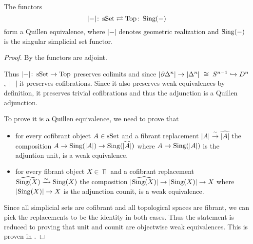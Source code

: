 \begin{prop}
    The functors
    \begin{equation*}
        \lvert-\rvert\colon\operatorname{sSet}\rightleftarrows\operatorname{Top}\colon\operatorname{Sing}(-)
    \end{equation*}
    form a Quillen equivalence, where $\lvert-\rvert$ denotes geometric realization and $\operatorname{Sing}(-)$ is the singular simplicial set functor.
    \begin{proof}
        By %
        the functors are adjoint.

        Thus $\lvert-\rvert\colon\operatorname{sSet}\to\operatorname{Top}$ preserves colimits and since $\lvert\partial\Delta^n\rvert\to\lvert\Delta^n\rvert\;\cong\;S^{n-1}\xhookrightarrow{} D^n$, $\lvert-\rvert$ it preserves cofibrations.
        Since it also preserves weak equivalences by definition, it preserves trivial cofibrations and thus the adjunction is a Quillen adjunction.

        To prove it is a Quillen equivalence, we need to prove that 
        \begin{itemize}
            \item for every cofibrant object $A\in\operatorname{sSet}$ and a fibrant replacement $\lvert A\rvert\xrightarrow{\sim}\widehat{\lvert A\rvert}$ the composition $A\to\operatorname{Sing}(\lvert A\rvert)\to\operatorname{Sing}(\widehat{\lvert A\rvert})$ where $A\to\operatorname{Sing}(\lvert A\rvert)$ is the adjuntion unit, is a weak equivalence.
            \item for every fibrant object $X\in\Top$ and a cofibrant replacement $\widehat{\operatorname{Sing}(X)}\xrightarrow{\sim}\operatorname{Sing}(X)$ the composition $\lvert\widehat{\operatorname{Sing}(X)}\rvert\to\lvert\operatorname{Sing}(X)\rvert\to X$ where $\lvert\operatorname{Sing}(X)\rvert\to X$ is the adjunction counit, is a weak equivalence.
        \end{itemize}
        Since all simplicial sets are cofibrant and all topological spaces are fibrant, we can pick the replacements to be the identity in both cases.
        Thus the statement is reduced to proving that unit and counit are objectwise weak equivalences. 
        This is proven in %
        .
    \end{proof}
\end{prop}
